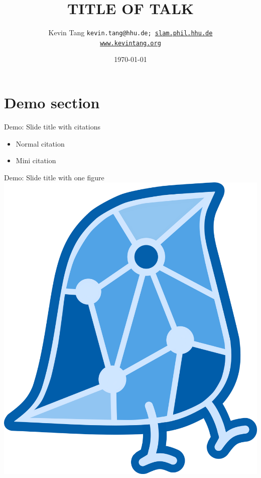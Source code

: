 \documentclass{beamer}
\title{TITLE OF TALK}
\author[shortname]{Kevin Tang\newline
	\newline\texttt{\footnotesize{kevin.tang@hhu.de}; \footnotesize{\url{slam.phil.hhu.de}}\\ \footnotesize{\url{www.kevintang.org}}}}
\date{\today}
\institute[shortinst]{Heinrich Heine University Dusseldorf}
\newcommand{\cit}[1]{{\tiny #1}}
\begin{document}
\newcommand{\newemph}[1]{{\color{carmine}{{#1}}}}
\frame{
  \titlepage
}





\newcommand{\flagKT}[1]{{\color{blue}{\textbf{#1}}}}


\section{Demo section}

\begin{frame}{Demo: Slide title with citations}
\begin{itemize}
\item Normal citation \citep{TangShaw_2021_ProsodyCognition}
\item Mini citation \cit{\citep{TangShaw_2021_ProsodyCognition}}
\end{itemize}
\end{frame}

\begin{frame}{Demo: Slide title with one figure}
\includegraphics[width=0.7\linewidth]{images/WAG.png}\\
\end{frame}
\end{document}
